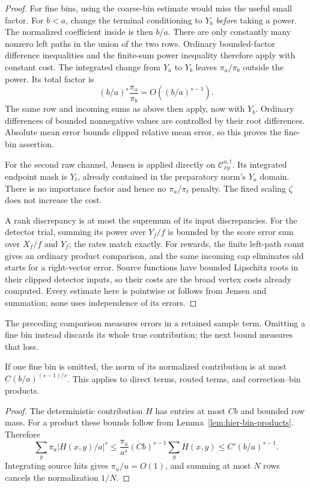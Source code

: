 \begin{proof}
For fine bins, using the coarse-bin estimate would miss the useful small factor. For $b<a$, change the terminal conditioning to $Y_b$ \emph{before}
taking a power.  The normalized coefficient inside is then $b/a$.
There are only constantly many nonzero left paths in the union of the
two rows.  Ordinary bounded-factor difference inequalities and the
finite-sum power inequality therefore apply with constant cost.  The
integrated change from $Y_a$ to $Y_b$ leaves $\pi_a/\pi_b$ outside the
power.  Its total factor is
\[
 (b/a)^s\frac{\pi_a}{\pi_b}=O((b/a)^{s-1}).
\]
The same row and incoming sums as above then apply, now with $Y_b$.
Ordinary differences of bounded nonnegative values are controlled by
their root differences.  Absolute mean error bounds clipped relative
mean error, so this proves the fine-bin assertion.

For the second raw channel, Jensen is applied directly on
$\mathcal C_{xy}^{u,t}$.  Its integrated endpoint mask is $Y_t$, already
contained in the preparatory norm's $Y_a$ domain.  There is no importance
factor and hence no $\pi_a/\pi_t$ penalty.  The fixed scaling $\zeta$
does not increase the cost.

A rank discrepancy is at most the supremum of its input discrepancies.
For the detector trial, summing its power over $Y_f/f$ is bounded by the
score error sum over $X_f/f$ and $Y_f$; the rates match exactly.
For rewards, the finite left-path count gives an ordinary product
comparison, and the same incoming cap eliminates old starts for a
right-vector error.  Source functions have bounded Lipschitz roots in
their clipped detector inputs, so their costs are the broad vertex costs
already computed.  Every estimate here is pointwise or follows from
Jensen and summation; none uses independence of its errors.
\end{proof}

The preceding comparison measures errors in a retained sample term.
Omitting a fine bin instead discards its whole true contribution; the
next bound measures that loss.

\begin{lemma}\label{lem:est-omission}
If one fine bin is omitted, the norm of its normalized contribution is at
most $C(b/a)^{(s-1)/s}$.  This applies to direct terms, routed terms, and
correction--bin products.
\end{lemma}
\begin{proof}
The deterministic contribution $H$ has entries at most $Cb$ and bounded
row mass.  For a product these bounds follow from
Lemma~\ref{lem:hier-bin-products}.  Therefore
\[
 \sum_y\pi_a|H(x,y)/a|^s
 \le \frac{\pi_a}{a^s}(Cb)^{s-1}\sum_yH(x,y)
 \le C'(b/a)^{s-1}.
\]
Integrating source hits gives $\pi_u/u=O(1)$, and summing at most $N$ rows
cancels the normalization $1/N$.
\end{proof}

